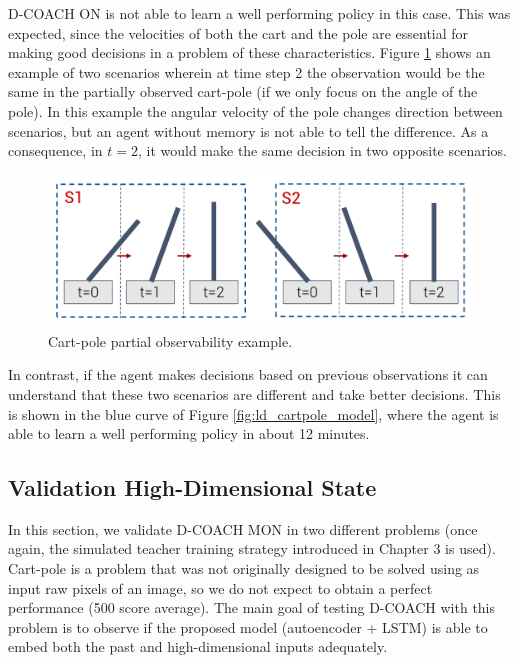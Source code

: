 D-COACH ON is not able to learn a well performing policy in this case. This was expected, since the velocities of both the cart and the pole are essential for making good decisions in a problem of these characteristics. Figure \ref{fig:cp_ex} shows an example of two scenarios wherein at time step 2 the observation would be the same in the partially observed cart-pole (if we only focus on the angle of the pole). In this example the angular velocity of the pole changes direction between scenarios, but an agent without memory is not able to tell the difference. As a consequence, in $t=2$, it would make the same decision in two opposite scenarios.

\begin{figure}[h]
    \centering
    \includegraphics[width=0.65\linewidth]{imagenes/cap4/cartpole_ex.pdf}
    \caption{Cart-pole partial observability example.}
    \label{fig:cp_ex}
    \vspace{-0.2cm}
\end{figure}

In contrast, if the agent makes decisions based on previous observations it can understand that these two scenarios are different and take better decisions. This is shown in the blue curve of Figure \ref{fig:ld_cartpole_model}, where the agent is able to learn a well performing policy in about 12 minutes. 

\subsection{Validation High-Dimensional State}
In this section, we validate D-COACH MON in two different problems (once again, the simulated teacher training strategy introduced in Chapter 3 is used). Cart-pole is a problem that was not originally designed to be solved using as input raw pixels of an image, so we do not expect to obtain a perfect performance (500 score average). The main goal of testing D-COACH with this problem is to observe if the proposed model (autoencoder + LSTM) is able to embed both the past and high-dimensional inputs adequately.

